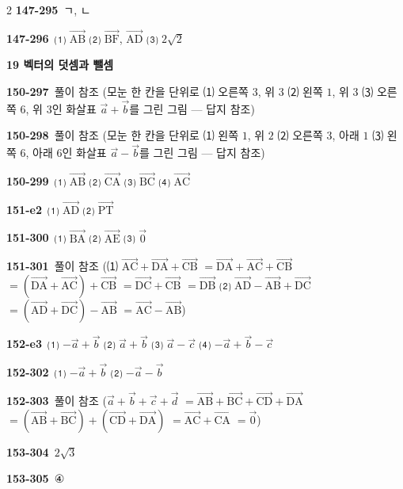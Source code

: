 \documentclass[10pt,a4paper]{article}
\newcommand{\pt}[1]{\mathrm{#1}}
\begin{document}
\begin{multicols}{2}
\noindent\textbf{147-295}\ ㄱ, ㄴ\par
\noindent\textbf{147-296}\ ⑴ $\overrightarrow{\pt{AB}}$ ⑵ $\overrightarrow{\pt{BF}}$, $\overrightarrow{\pt{AD}}$ ⑶ $2\sqrt{2}$\par
\noindent\textbf{19 벡터의 덧셈과 뺄셈}\par\smallskip
\noindent\textbf{150-297}\ 풀이 참조 (모눈 한 칸을 단위로 ⑴ 오른쪽 $3$, 위 $3$ ⑵ 왼쪽 $1$, 위 $3$ ⑶ 오른쪽 $6$, 위 $3$인 화살표 $\vec{a}+\vec{b}$를 그린 그림 — 답지 참조)\par
\noindent\textbf{150-298}\ 풀이 참조 (모눈 한 칸을 단위로 ⑴ 왼쪽 $1$, 위 $2$ ⑵ 오른쪽 $3$, 아래 $1$ ⑶ 왼쪽 $6$, 아래 $6$인 화살표 $\vec{a}-\vec{b}$를 그린 그림 — 답지 참조)\par
\noindent\textbf{150-299}\ ⑴ $\overrightarrow{\pt{AB}}$ ⑵ $\overrightarrow{\pt{CA}}$ ⑶ $\overrightarrow{\pt{BC}}$ ⑷ $\overrightarrow{\pt{AC}}$\par
\noindent\textbf{151-e2}\ ⑴ $\overrightarrow{\pt{AD}}$ ⑵ $\overrightarrow{\pt{PT}}$\par
\noindent\textbf{151-300}\ ⑴ $\overrightarrow{\pt{BA}}$ ⑵ $\overrightarrow{\pt{AE}}$ ⑶ $\vec{0}$\par
\noindent\textbf{151-301}\ 풀이 참조 (⑴ $\overrightarrow{\pt{AC}}+\overrightarrow{\pt{DA}}+\overrightarrow{\pt{CB}}$ $=\overrightarrow{\pt{DA}}+\overrightarrow{\pt{AC}}+\overrightarrow{\pt{CB}}$ $=(\overrightarrow{\pt{DA}}+\overrightarrow{\pt{AC}})+\overrightarrow{\pt{CB}}$ $=\overrightarrow{\pt{DC}}+\overrightarrow{\pt{CB}}$ $=\overrightarrow{\pt{DB}}$ ⑵ $\overrightarrow{\pt{AD}}-\overrightarrow{\pt{AB}}+\overrightarrow{\pt{DC}}$ $=(\overrightarrow{\pt{AD}}+\overrightarrow{\pt{DC}})-\overrightarrow{\pt{AB}}$ $=\overrightarrow{\pt{AC}}-\overrightarrow{\pt{AB}}$)\par
\noindent\textbf{152-e3}\ ⑴ $-\vec{a}+\vec{b}$ ⑵ $\vec{a}+\vec{b}$ ⑶ $\vec{a}-\vec{c}$ ⑷ $-\vec{a}+\vec{b}-\vec{c}$\par
\noindent\textbf{152-302}\ ⑴ $-\vec{a}+\vec{b}$ ⑵ $-\vec{a}-\vec{b}$\par
\noindent\textbf{152-303}\ 풀이 참조 ($\vec{a}+\vec{b}+\vec{c}+\vec{d}$ $=\overrightarrow{\pt{AB}}+\overrightarrow{\pt{BC}}+\overrightarrow{\pt{CD}}+\overrightarrow{\pt{DA}}$ $=(\overrightarrow{\pt{AB}}+\overrightarrow{\pt{BC}})+(\overrightarrow{\pt{CD}}+\overrightarrow{\pt{DA}})$ $=\overrightarrow{\pt{AC}}+\overrightarrow{\pt{CA}}$ $=\vec{0}$)\par
\noindent\textbf{153-304}\ $2\sqrt{3}$\par
\noindent\textbf{153-305}\ ④\par

\end{multicols}
\end{document}
